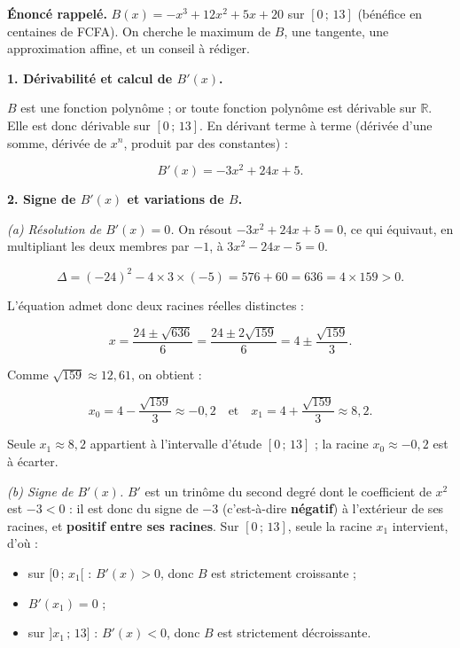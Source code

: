 \documentclass[11pt]{article}
\begin{document}
\begin{exoresolu}
\textbf{Énoncé rappelé.} $B(x) = -x^3 + 12x^2 + 5x + 20$ sur $[0\,;\,13]$ (bénéfice en centaines de FCFA). On cherche le maximum de $B$, une tangente, une approximation affine, et un conseil à rédiger.

\tcblower

\textbf{1. Dérivabilité et calcul de $B'(x)$.}

$B$ est une fonction polynôme ; or toute fonction polynôme est dérivable sur $\mathbb{R}$. Elle est donc dérivable sur $[0\,;\,13]$. En dérivant terme à terme (dérivée d'une somme, dérivée de $x^n$, produit par des constantes) :

\[ B'(x) = -3x^2 + 24x + 5. \]

\textbf{2. Signe de $B'(x)$ et variations de $B$.}

\emph{(a) Résolution de $B'(x) = 0$.} On résout $-3x^2 + 24x + 5 = 0$, ce qui équivaut, en multipliant les deux membres par $-1$, à $3x^2 - 24x - 5 = 0$.

\[ \Delta = (-24)^2 - 4 \times 3 \times (-5) = 576 + 60 = 636 = 4 \times 159 > 0. \]

L'équation admet donc deux racines réelles distinctes :

\[ x = \frac{24 \pm \sqrt{636}}{6} = \frac{24 \pm 2\sqrt{159}}{6} = 4 \pm \frac{\sqrt{159}}{3}. \]

Comme $\sqrt{159} \approx 12{,}61$, on obtient :

\[ x_0 = 4 - \frac{\sqrt{159}}{3} \approx -0{,}2 \quad \text{et} \quad x_1 = 4 + \frac{\sqrt{159}}{3} \approx 8{,}2. \]

Seule $x_1 \approx 8{,}2$ appartient à l'intervalle d'étude $[0\,;\,13]$ ; la racine $x_0 \approx -0{,}2$ est à écarter.

\emph{(b) Signe de $B'(x)$.} $B'$ est un trinôme du second degré dont le coefficient de $x^2$ est $-3 < 0$ : il est donc du signe de $-3$ (c'est-à-dire \textbf{négatif}) à l'extérieur de ses racines, et \textbf{positif entre ses racines}. Sur $[0\,;\,13]$, seule la racine $x_1$ intervient, d'où :

\begin{itemize}
\item sur $[0\,;\,x_1[$ : $B'(x) > 0$, donc $B$ est strictement croissante ;
\item $B'(x_1) = 0$ ;
\item sur $]x_1\,;\,13]$ : $B'(x) < 0$, donc $B$ est strictement décroissante.
\end{itemize}


\end{exoresolu}
\end{document}
